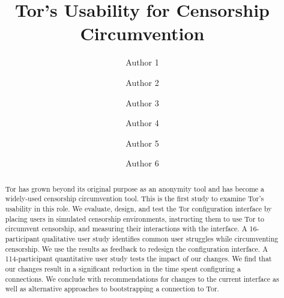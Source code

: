 \documentclass[USenglish,oneside,twocolumn]{article}
\begin{document}
   \author*[1]{Author 1}

  \author[2]{Author 2}

  \author[3]{Author 3}

  \author[4]{Author 4}

  \author[5]{Author 5}
  
  \author[6]{Author 6}

%
%
%
%
%  
%
%
%
%
%  
%   

  \title{\huge Tor's Usability for Censorship Circumvention}



  \begin{abstract}
{Tor has grown beyond its original purpose as an anonymity tool and has 
become a widely-used censorship circumvention tool.
This is the first study to examine Tor's usability in this role.
We evaluate, design, and test the Tor configuration interface by
placing users in simulated censorship environments, instructing them to use Tor
to circumvent censorship, and measuring their interactions with the interface.
A 16-participant qualitative user study identifies common user struggles while circumventing censorship.
We use the results as feedback to redesign the configuration interface.
A 114-participant quantitative user study tests the impact of our changes.
We find that our changes result in a significant reduction 
in the time spent configuring a connections. We
conclude with recommendations for changes to the current interface as well as 
alternative approaches to bootstrapping a connection to Tor.}
\end{abstract}
\end{document}
